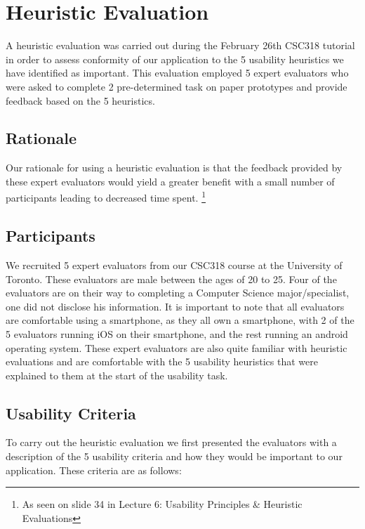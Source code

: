 \documentclass[pdftex,12pt,a4paper]{report}
\begin{document}

\tableofcontents

\chapter{Heuristic Evaluation}
A heuristic evaluation was carried out during the February 26th CSC318 tutorial in order to assess conformity of our application to the 5 usability heuristics we have identified as important. This evaluation employed 5 expert evaluators who were asked to complete 2 pre-determined task on paper prototypes and provide feedback based on the 5 heuristics.

\section{Rationale}
Our rationale for using a heuristic evaluation is that the feedback provided by these expert evaluators would yield a greater benefit with a small number of participants leading to decreased time spent. \footnote{As seen on slide 34 in Lecture 6: Usability Principles \& Heuristic Evaluations}

\section{Participants}
We recruited 5 expert evaluators from our CSC318 course at the University of Toronto. These evaluators are male between the ages of 20 to 25. Four of the evaluators are on their way to completing a Computer Science major/specialist, one did not disclose his information. It is important to note that all evaluators are comfortable using a smartphone, as they all own a smartphone, with 2 of the 5 evaluators running iOS on their smartphone, and the rest running an android operating system. These expert evaluators are also quite familiar with heuristic evaluations and are comfortable with the 5 usability heuristics that were explained to them at the start of the usability task.
\section{Usability Criteria}

To carry out the heuristic evaluation we first presented the evaluators with a description of the 5 usability criteria and how they would be important to our application. These criteria are as follows:
\vspace{0.7cm}
\end{document}
